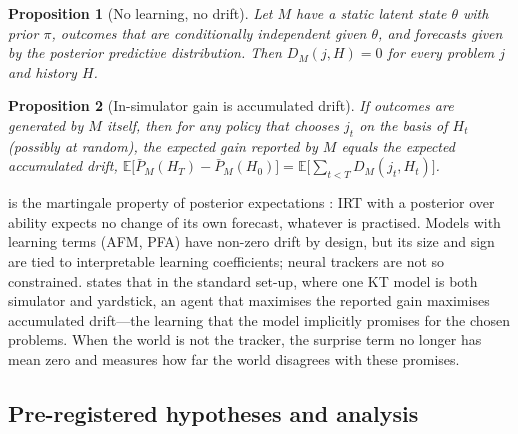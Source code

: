 \documentclass[a4paper,preprint,12pt,authoryear]{elsarticle}
\newtheorem{proposition}{Proposition}
\begin{document}
\begin{proposition}[No learning, no drift]\label{prop:nodrift}
Let $M$ have a static latent state $\theta$ with prior $\pi$, outcomes that are conditionally independent given $\theta$, and forecasts given by the posterior predictive distribution. Then $D_M(j,H)=0$ for every problem $j$ and history $H$.
\end{proposition}

\begin{proposition}[In-simulator gain is accumulated drift]\label{prop:insim}
If outcomes are generated by $M$ itself, then for any policy that chooses $j_t$ on the basis of $H_t$ (possibly at random), the expected gain reported by $M$ equals the expected accumulated drift, $\mathbb E\bigl[\bar P_M(H_T)-\bar P_M(H_0)\bigr] = \mathbb E\bigl[\sum_{t<T} D_M(j_t,H_t)\bigr]$.
\end{proposition}

 is the martingale property of posterior expectations \citep{williams1991probability}: IRT with a posterior over ability expects no change of its own forecast, whatever is practised. Models with learning terms (AFM, PFA) have non-zero drift by design, but its size and sign are tied to interpretable learning coefficients; neural trackers are not so constrained.  states that in the standard set-up, where one KT model is both simulator and yardstick, an agent that maximises the reported gain maximises accumulated drift---the learning that the model implicitly promises for the chosen problems. When the world is not the tracker, the surprise term no longer has mean zero and measures how far the world disagrees with these promises.

\subsection{Pre-registered hypotheses and analysis}\label{sec:protocol}
\end{document}
